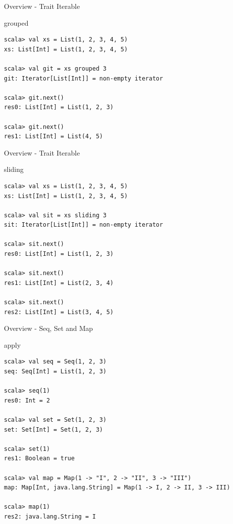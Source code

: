\begin{frame}[fragile]{Overview - Trait Iterable}
\begin{exampleblock}{grouped}
\begin{lstlisting}
scala> val xs = List(1, 2, 3, 4, 5)
xs: List[Int] = List(1, 2, 3, 4, 5)

scala> val git = xs grouped 3
git: Iterator[List[Int]] = non-empty iterator

scala> git.next()
res0: List[Int] = List(1, 2, 3)

scala> git.next()
res1: List[Int] = List(4, 5)
\end{lstlisting}
\end{exampleblock}
\end{frame}

\begin{frame}[fragile]{Overview - Trait Iterable}
\begin{exampleblock}{sliding}
\begin{lstlisting}
scala> val xs = List(1, 2, 3, 4, 5)
xs: List[Int] = List(1, 2, 3, 4, 5)

scala> val sit = xs sliding 3
sit: Iterator[List[Int]] = non-empty iterator

scala> sit.next()
res0: List[Int] = List(1, 2, 3)

scala> sit.next()
res1: List[Int] = List(2, 3, 4)

scala> sit.next()
res2: List[Int] = List(3, 4, 5) 
\end{lstlisting}
\end{exampleblock}
\end{frame}

\begin{frame}[fragile]{Overview - Seq, Set and Map}
\begin{exampleblock}{apply}
\begin{lstlisting}
scala> val seq = Seq(1, 2, 3)
seq: Seq[Int] = List(1, 2, 3)

scala> seq(1)
res0: Int = 2

scala> val set = Set(1, 2, 3)
set: Set[Int] = Set(1, 2, 3)

scala> set(1)
res1: Boolean = true

scala> val map = Map(1 -> "I", 2 -> "II", 3 -> "III")
map: Map[Int, java.lang.String] = Map(1 -> I, 2 -> II, 3 -> III)

scala> map(1)
res2: java.lang.String = I
\end{lstlisting}
\end{exampleblock}
\end{frame}

